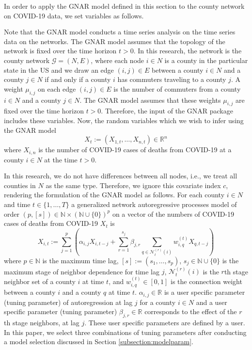 In order to apply the {GNAR} model defined in this section to the county network on {COVID-19} data, we set variables as follows.  

Note that the {GNAR} model conducts a time series analysis on the time series data on the networks.  The {GNAR} model assumes that the topology of the network is fixed over the time horizon $t > 0$.  In this research, the network is the county network $\mathcal{G} = (N, E)$, where each node $i \in N$ is a county in the particular state in the {US} and we draw an edge $(i, j) \in E$ between a county $i \in N$ and a county $j \in N$ if and only if a county $i$ has commuters traveling to a county $j$. A weight $\mu_{i, j}$ on each edge $(i, j) \in E$ is the number of commuters from a county $i \in N$ and a county $j \in N$. The {GNAR} model assumes that these weights $\mu_{i, j}$ are fixed over the time horizon $t > 0$.  Therefore, the input of the {GNAR} package includes these variables.  Now, the random variables which we wish to infer using the {GNAR} model 
\[
X_t := (X_{1, t}, \ldots , X_{n, t}) \in \mathbb{R}^n
\]
where $X_{i, n}$ is the number of {COVID-19} cases of deaths from {COVID-19} at a county $i \in N$ at the time $t > 0$.

In this research, we do not have differences between all nodes, i.e., we treat all counties in $N$ as the same type. Therefore, we ignore this covariate index $c$, rendering the formulation of the {GNAR} model as follows. For each county $i \in N$ and time $t \in \{1, \ldots , T\}$ a generalized network autoregressive processes model of order $(p, [s]) \in \mathbb{N} \times (\mathbb{N}\cup \{0\})^p$ on a vector of the numbers of {COVID-19} cases of deaths from {COVID-19} $X_t$ is
\begin{equation}\label{eq:gnar2}
    X_{i, t}:= \sum_{j = 1}^p \left(\alpha_{i, j}X_{i, t-j} + \sum_{r = 1}^{s_j}\beta_{j, r} \sum_{q \in \mathcal{N}_t^{(r)}(i)} w_{i, q}^{(t)}X_{q, t-j}\right)
\end{equation}
where $p \in \mathbb{N}$ is the maximum time lag, $[s]:= (s_1, \ldots , s_p)$, $s_j \in \mathbb{N} \cup \{0\}$ is the maximum stage of neighbor dependence for time lag $j$, $\mathcal{N}_t^{(r)}(i)$ is the $r$th stage neighbor set of a county $i$ at time $t$, and  $w_{i, q}^{(t)} \in [0, 1]$ is the connection weight between a county $i$ and a county $q$ at time $t$. $\alpha_{i, j} \in \mathbb{R}$ is a user specific parameter (tuning parameter) of autoregression at lag $j$ for a county $i \in N$ and a user specific parameter (tuning parameter) $\beta_{j, r} \in \mathbb{R}$ corresponds to the effect of the $r$th stage neighbors, at lag $j$. These user specific parameters are defined by a user. In this paper, we select three combinations of tuning parameters after conducting a model selection discussed in Section \ref{subsection:modelparam}.  


